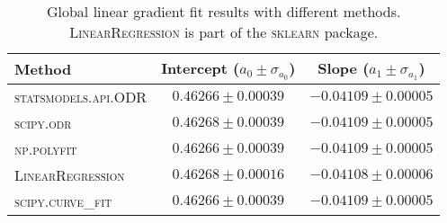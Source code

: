 
\begin{table}
\caption{Global linear gradient fit results with different methods. \textsc{LinearRegression} is part of the \textsc{sklearn} package.}
\label{tab:global_fit_results_per_method}
\begin{tabularx}{\columnwidth}{lCC}
\hline
Method & Intercept ($a_0 \pm \sigma_{a_0}$) & Slope ($a_1 \pm \sigma_{a_1}$) \\
\hline
\textsc{statsmodels.api.ODR} & $0.46266 \pm 0.00039$ & $-0.04109 \pm 0.00005$ \\
\textsc{scipy.odr} & $0.46268 \pm 0.00039$ & $-0.04109 \pm 0.00005$ \\
\textsc{np.polyfit} & $0.46266 \pm 0.00039$ & $-0.04109 \pm 0.00005$ \\
\textsc{LinearRegression} & $0.46268 \pm 0.00016$ & $-0.04108 \pm 0.00006$ \\
\textsc{scipy.curve\_fit} & $0.46266 \pm 0.00039$ & $-0.04109 \pm 0.00005$ \\
\hline
\end{tabularx}
\end{table}
